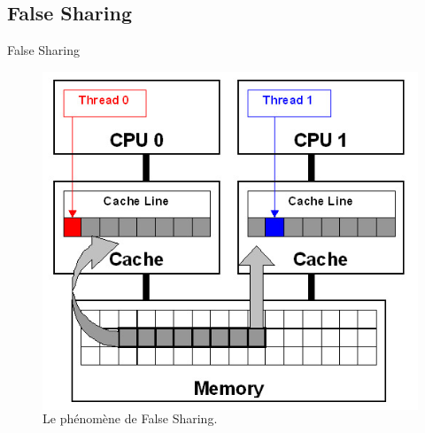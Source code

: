 \documentclass{beamer}
\begin{document}
\subsection{False Sharing}
\begin{frame}{False Sharing}
	\begin{figure}
	\begin{columns}
      \includegraphics[width=\textwidth]{false_sharing.jpg}
      \caption{Le phénomène de False Sharing.\label{Fig:false_sharing}}
    \end{columns}	
    \end{figure}
\end{frame}
\end{document}
